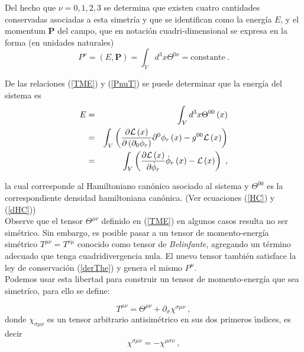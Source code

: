 \noindent
Del hecho que $\nu=0,1,2,3$ se determina que existen cuatro cantidades conservadas asociadas a esta simetría y que se identifican como la energía $E$, y el momentum $\mathbf{P}$ del campo, que en notación cuadri-dimensional se expresa en la forma (en unidades naturales)
\begin{equation}
    P^{\nu}=\left(E,\mathbf{P}\right)=\int_{V} d^{3}x \Theta ^{0 \nu} =\text{constante}~.
    \label{PnuT}
\end{equation}

\noindent
De las relaciones (\ref{TME}) y (\ref{PnuT}) se puede determinar que la energía del sistema es
\begin{eqnarray}
E &=&\int_{V}d^{3}x\Theta ^{00}\left( x\right)   \notag \\
&=&\int_{V}\left( \frac{\partial \mathcal{L}\left( x\right) }{\partial \left( \partial _{0}\phi _{r}\right) }\partial ^{0}\phi _{r}\left( x\right)-g^{00}\mathcal{L}\left( x\right) \right)   \notag \\
&=&\int_{V}\left( \frac{\partial \mathcal{L}\left( x\right) }{\partial \dot{\phi}_{r}}\dot{\phi}_{r}\left( x\right)-\mathcal{L}\left( x\right) \right) ~,
\end{eqnarray}
 
 la cual corresponde al Hamiltoniano canónico asociado al sistema y $\Theta^{00}$ es la correspondiente densidad hamiltoniana canónica. (Ver ecuaciones (\ref{HC}) y (\ref{dHC}))\\
  
Observe que el tensor $\Theta^{\mu \nu}$ definido en (\ref{TME}) en algunos casos resulta no ser simétrico. Sin embargo, es posible pasar a un tensor de momento-energía simétrico $T^{\mu \nu}=T^{\nu \mu}$ conocido como tensor de \emph{Belinfante}, agregando un término adecuado que tenga cuadridivergencia nula. El nuevo tensor también satisface la ley de conservación (\ref{derThe}) y genera el mismo $P^{\mu}$.\\
 
 \noindent
Podemos usar esta libertad para construir un tensor de momento-energía que sea simetríco, para ello se define:
 
\begin{equation}
T^{\mu \nu }=\Theta ^{\mu \nu }+\partial _{\sigma }\chi ^{\sigma \mu \nu }~,
\end{equation}%
donde $\chi _{\sigma \mu \nu }$ es un tensor arbitrario antisim\'{e}trico en
sus dos primeros \'{\i}ndices, es decir%
\begin{equation}
\chi ^{\sigma \mu \nu }=-\chi ^{\mu \sigma \nu }~,
\end{equation}


